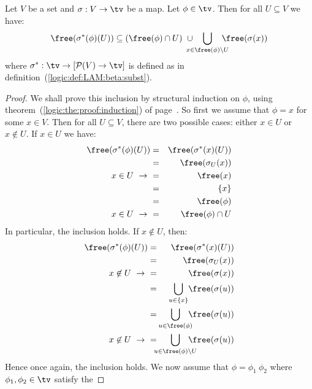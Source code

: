 \begin{prop}\label{logic:prop:LAM:freevar:of:betasubst:gen}
Let $V$ be a set and $\sigma:V\to\tv$ be a map. Let $\phi\in\tv$.
Then for all $U\subseteq V$ we have:
    \[
        \free(\sigma^{*}(\phi)(U)) 
            \subseteq 
        (\free(\phi)\cap U)
        \ \cup\ 
        \!\!\!\!\!\!\!\!
        \bigcup_{x\in\free(\phi)\setminus U}
        \!\!\!\!\!\!
        \free(\sigma(x))
    \]
where $\sigma^{*}:\tv\to[{\cal P}(V)\to\tv]$ is defined as in 
definition~(\ref{logic:def:LAM:beta:subst}).
\end{prop}
\begin{proof}
We shall prove this inclusion by structural induction on $\phi$, using
theorem~(\ref{logic:the:proof:induction}) of 
page~\pageref{logic:the:proof:induction}. So first we assume that $\phi=x$ 
for some $x\in V$. Then for all $U\subseteq V$, there are two possible cases: 
either $x\in U$ or $x\not\in U$. If $x\in U$ we have:
    \begin{eqnarray*}
        \free(\sigma^{*}(\phi)(U))
        &=&\free(\sigma^{*}(x)(U))\\
        &=&\free(\sigma_{U}(x))\\
        \mbox{$x\in U\ \rightarrow\ $}&=&\free(x)\\
         &=&\{x\}\\
         &=&\free(\phi)\\
        \mbox{$x\in U\ \rightarrow\ $}&=&\free(\phi)\cap U
    \end{eqnarray*}
In particular, the inclusion holds. If $x\not\in U$, then:
     \begin{eqnarray*}
        \free(\sigma^{*}(\phi)(U))
        &=&\free(\sigma^{*}(x)(U))\\
        &=&\free(\sigma_{U}(x))\\
        \mbox{$x\not\in U\ \rightarrow\ $}&=&\free(\sigma(x))\\
        &=&
        \!\!\!
        \bigcup_{u\in\{x\}} 
        \!
        \free(\sigma(u))\\
        &=&
        \!\!\!\!\!
        \bigcup_{u\in\free(\phi)}
        \!\!\!\!
        \free(\sigma(u))\\
        \mbox{$x\not\in U\ \rightarrow\ $}
        &=&\!\!\!\!\!\!\!\!
        \bigcup_{u\in\free(\phi)\setminus U}
        \!\!\!\!\!\!\!
        \free(\sigma(u))
    \end{eqnarray*}
Hence once again, the inclusion holds. We now assume that 
$\phi=\phi_{1}\ \phi_{2}$ where $\phi_{1}, \phi_{2}\in\tv$ satisfy the 

\end{proof}
